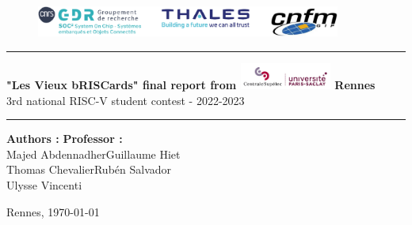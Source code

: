 \begin{titlepage}

\begin{figure}[ht]
    \centering
    \includegraphics[width=10cm]{img/logo_partenairs.png}
\end{figure}
\begin{center}
	\noindent\rule{9cm}{0.4pt}

	\begin{spacing}{2}


	{\huge\bfseries "Les Vieux bRISCards" final report from \includegraphics[width=3cm]{img/logoCentrale.png} \textbf{Rennes}} \\
	{\large  3rd national RISC-V student contest - 2022-2023}
	\end{spacing}

	\noindent\rule{8cm}{0.4pt}
\end{center}

	\begin{spacing}{1}
	{\large \textbf{Authors :} }\hfill{\large \textbf{Professor :} }\\
	{Majed Abdennadher}\hfill{Guillaume Hiet}\\
    {Thomas Chevalier}\hfill{Rubén Salvador}\\
    {Ulysse Vincenti}
	\end{spacing}
\begin{center}
	\tableofcontents

\vspace*{\fill}

\end{center}

\begin{flushright}
	Rennes, \today
\end{flushright}

\end{titlepage}